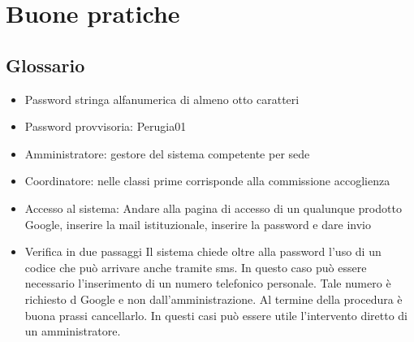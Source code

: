 \chapter{Buone pratiche}
\printpartialtoc
\section{Glossario}
\begin{itemize}
	\item Password stringa alfanumerica di almeno otto caratteri
	\item Password provvisoria: Perugia01
	\item Amministratore: gestore del sistema competente per sede
	\item Coordinatore: nelle classi prime corrisponde alla commissione 
	accoglienza
	\item Accesso al sistema: Andare alla pagina di accesso di un qualunque 
	prodotto Google, inserire la mail istituzionale, inserire la password e 
	dare invio
	\item Verifica in due passaggi Il sistema chiede oltre alla password l'uso 
	di un codice che può arrivare anche tramite sms. In questo caso può essere necessario
	l'inserimento di un numero telefonico personale. Tale numero è richiesto d Google e 
	non dall'amministrazione. Al termine della procedura è buona prassi 
	cancellarlo. In questi casi può essere utile l'intervento diretto di un 
	amministratore.
\end{itemize}

